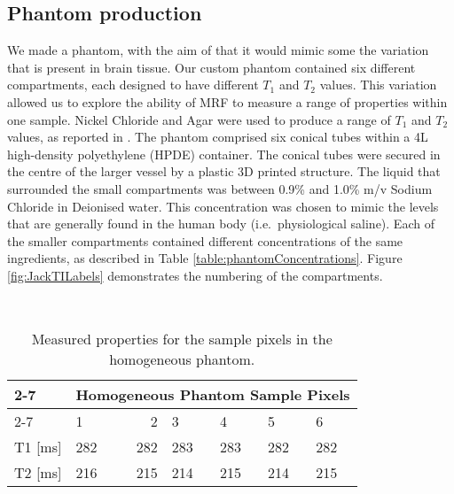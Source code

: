 \documentclass[journal]{IEEEtran}
\begin{document}
\subsection{Phantom production}
We made a phantom, with the aim of that it would mimic some the variation that is present in brain tissue.
Our custom phantom contained six different compartments, each designed to have different $T_1$ and $T_2$ values. %
This variation allowed us to explore the ability of MRF to measure a range of properties within one sample. 
Nickel Chloride and Agar were used to produce a range of $T_1$ and $T_2$ values, as reported in \cite{cochlin2003dependence}. The phantom comprised six conical tubes within a 4L high-density polyethylene (HPDE) container. The conical tubes were secured in the centre of the larger vessel by a plastic 3D printed structure. The liquid that surrounded the small compartments was between 0.9\% and 1.0\% m/v Sodium Chloride in Deionised water. This concentration was chosen to mimic the levels that are generally found in the human body (i.e.\ physiological saline).  Each of the smaller compartments contained different concentrations of the same ingredients, as described in Table \ref{table:phantomConcentrations}.
Figure \ref{fig:JackTILabels} demonstrates the numbering of the compartments.

\begin{table}[]
\centering
\
\begin{tabular}{|l|l|r|l|l|l|l|}
\cline{2-7}
\multicolumn{1}{c|} {\multirow{2}{*}{}} & \multicolumn{6}{l|}{\cellcolor[HTML]{EFEFEF} Homogeneous Phantom Sample Pixels} \\ \cline{2-7} 
\multicolumn{1}{c|}{} & 1 & 2 & 3 & 4 & 5 & 6 \\ \hline
T1 [ms]& 282 & 282 & 283 & 283 & 282 & 282 \\ \hline
T2 [ms] &  216& 215 & 214 & 215  & 214 &  215\\ \hline
\end{tabular}
\\\
\caption{Measured properties for the sample pixels in the homogeneous phantom.}
\label{table:homogeneousPhantomMeasurements}
\end{table}
\end{document}
